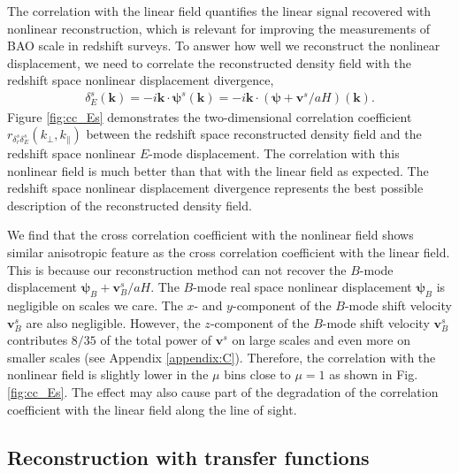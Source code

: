 \documentclass[aps,prx,twocolumn,superscriptaddress,groupedaddress,nofootinbib,amsfont]{revtex4}  %
\newcommand{\bea}{\begin{eqnarray}}
\newcommand{\eea}{\end{eqnarray}}
\newcommand{\bmp}{\bm{\psi}}
\newcommand{\bmv}{\bm{v}}
\newcommand{\bmk}{\bm{k}}
\begin{document}
The correlation with the linear field quantifies the linear signal recovered
with nonlinear reconstruction, which is relevant for improving the measurements
of BAO scale in redshift surveys. 
To answer how well we reconstruct the nonlinear displacement, we need to
correlate the reconstructed density field with the redshift space nonlinear 
displacement divergence,
\bea
\delta_E^s(\bmk)=-i\bmk\cdot\bmp^s(\bmk)=-i\bmk\cdot(\bmp+\bmv^s/aH)(\bmk).
\eea
Figure \ref{fig:cc_Es} demonstrates the two-dimensional correlation coefficient 
$r_{\delta_r^s\delta_E^s}(k_\perp,k_\parallel)$ between the redshift space reconstructed density field and the redshift space nonlinear $E$-mode displacement.
The correlation with this nonlinear field is much better than that with the 
linear field as expected.
The redshift space nonlinear displacement divergence represents the best 
possible description of the reconstructed density field.

We find that the cross correlation coefficient with the nonlinear field shows 
similar anisotropic feature as the cross correlation coefficient with the 
linear field. This is because our reconstruction method can not recover the 
$B$-mode displacement $\bmp_B+\bmv_B^s/aH$. The $B$-mode real space nonlinear 
displacement $\bmp_B$ is negligible on scales we care. The $x$- and $y$-component of the $B$-mode shift velocity $\bmv^s_B$ are also negligible.
However, the $z$-component of the $B$-mode shift velocity $\bmv^s_B$ contributes
$8/35$ of the total power of $\bmv^s$ on large scales and even more on smaller
scales (see Appendix \ref{appendix:C}). 
Therefore, the correlation with the nonlinear field is slightly lower in the 
$\mu$ bins close to $\mu=1$ as shown in Fig. \ref{fig:cc_Es}.
The effect may also cause part of the degradation of the correlation coefficient
with the linear field along the line of sight.


\subsection{Reconstruction with transfer functions}
\end{document}
